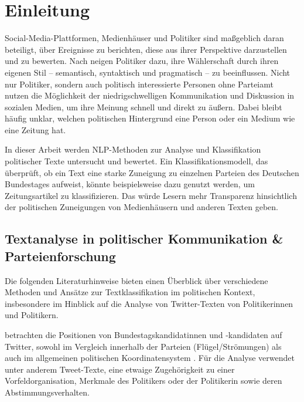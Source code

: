 
\chapter{Einleitung} \label{ch:introduction}

Social-Media-Plattformen, Medienhäuser und Politiker sind maßgeblich daran beteiligt, über Ereignisse zu berichten, diese aus ihrer Perspektive darzustellen und zu bewerten. Nach \textcite{willeke_soziale_2019} neigen Politiker dazu, ihre Wählerschaft durch ihren eigenen Stil -- semantisch, syntaktisch und pragmatisch -- zu beeinflussen. Nicht nur Politiker, sondern auch politisch interessierte Personen ohne Parteiamt nutzen die Möglichkeit der niedrigschwelligen Kommunikation und Diskussion in sozialen Medien, um ihre Meinung schnell und direkt zu äußern. Dabei bleibt häufig unklar, welchen politischen Hintergrund eine Person oder ein Medium wie eine Zeitung hat.

In dieser Arbeit werden \ac{NLP}-Methoden zur Analyse und Klassifikation politischer Texte untersucht und bewertet. Ein Klassifikationsmodell, das überprüft, ob ein Text eine starke Zuneigung zu einzelnen Parteien des Deutschen Bundestages aufweist, könnte beispielsweise dazu genutzt werden, um Zeitungsartikel zu klassifizieren. Das würde Lesern mehr Transparenz hinsichtlich der politischen Zuneigungen von Medienhäusern und anderen Texten geben.

\section{Textanalyse in politischer Kommunikation \& Parteienforschung} \label{sec:introductionTextanalysis}

Die folgenden Literaturhinweise bieten einen Überblick über verschiedene Methoden und Ansätze zur Textklassifikation im politischen Kontext, insbesondere im Hinblick auf die Analyse von Twitter-Texten von Politikerinnen und Politikern.

\textcite{saltzer_bundestagswahl_2022} betrachten die Positionen von Bundestagskandidatinnen und -kandidaten auf Twitter, sowohl im Vergleich innerhalb der Parteien (Flügel/Strömungen) als auch im allgemeinen politischen Koordinatensystem \autocite{saltzer_bundestagswahl_2022, saltzer_finding_2022}. Für die Analyse verwendet \textcite{saltzer_finding_2022} unter anderem Tweet-Texte, eine etwaige Zugehörigkeit zu einer Vorfeldorganisation, Merkmale des Politikers oder der Politikerin sowie deren Abstimmungsverhalten.

